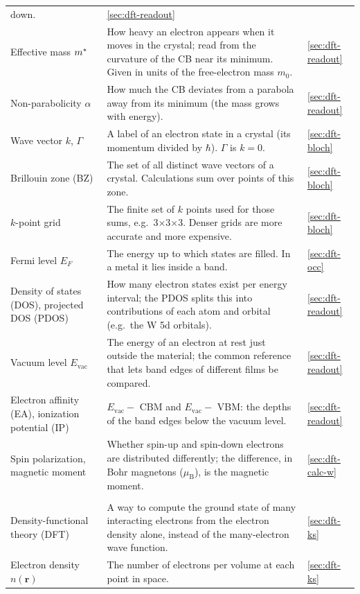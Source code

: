 \begin{small}
\begin{longtable}{@{}>{\raggedright\arraybackslash}p{3.3cm}>{\raggedright\arraybackslash}p{9.0cm}>{\raggedright\arraybackslash}p{1.6cm}@{}}
down. & \ref{sec:dft-readout} \\
Effective mass $m^{*}$ & How heavy an electron appears when it moves in the crystal; read from the curvature of the
CB near its minimum. Given in units of the free-electron mass $m_0$. & \ref{sec:dft-readout} \\
Non-parabolicity $\alpha$ & How much the CB deviates from a parabola away from its minimum (the mass grows with energy). & \ref{sec:dft-readout} \\
Wave vector $k$, $\Gamma$ & A label of an electron state in a crystal (its momentum divided by $\hbar$). $\Gamma$ is
$k = 0$. & \ref{sec:dft-bloch} \\
Brillouin zone (BZ) & The set of all distinct wave vectors of a crystal. Calculations sum over points of this zone. & \ref{sec:dft-bloch} \\
$k$-point grid & The finite set of $k$ points used for those sums, e.g.\ 3$\times$3$\times$3. Denser grids are more
accurate and more expensive. & \ref{sec:dft-bloch} \\
Fermi level $E_F$ & The energy up to which states are filled. In a metal it lies inside a band. & \ref{sec:dft-occ} \\
Density of states (DOS), projected DOS (PDOS) & How many electron states exist per energy interval; the PDOS
splits this into contributions of each atom and orbital (e.g.\ the W 5d orbitals). & \ref{sec:dft-readout} \\
Vacuum level $E_{\mathrm{vac}}$ & The energy of an electron at rest just outside the material; the common reference that
lets band edges of different films be compared. & \ref{sec:dft-readout} \\
Electron affinity (EA), ionization potential (IP) & $E_{\mathrm{vac}} - $ CBM and $E_{\mathrm{vac}} - $ VBM: the depths
of the band edges below the vacuum level. & \ref{sec:dft-readout} \\
Spin polarization, magnetic moment & Whether spin-up and spin-down electrons are distributed differently; the
difference, in Bohr magnetons ($\mu_{\mathrm{B}}$), is the magnetic moment. & \ref{sec:dft-calc-w} \\
\midrule
\multicolumn{3}{@{}l}{\textit{The DFT method}}\\
Density-functional theory (DFT) & A way to compute the ground state of many interacting electrons from the electron
density alone, instead of the many-electron wave function. & \ref{sec:dft-ks} \\
Electron density $n(\mathbf{r})$ & The number of electrons per volume at each point in space. & \ref{sec:dft-ks} \\

\end{longtable}
\end{small}
